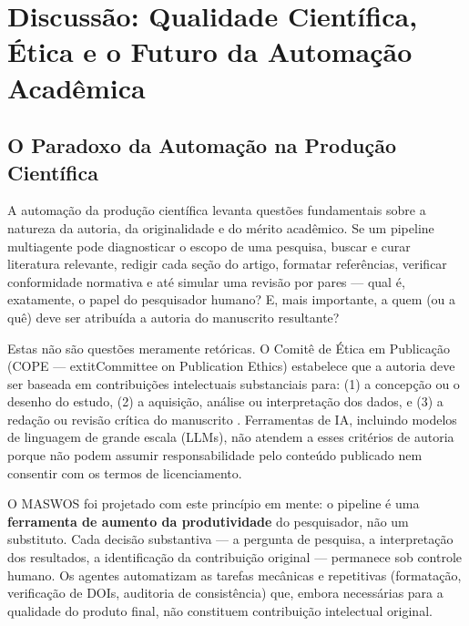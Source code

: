 

\section{Discussão: Qualidade Científica, Ética e o Futuro da Automação Acadêmica}
\label{sec:discussao_final}

\subsection{O Paradoxo da Automação na Produção Científica}
\label{sec:paradoxo}

A automação da produção científica levanta questões fundamentais
sobre a natureza da autoria, da originalidade e do mérito
acadêmico. Se um pipeline multiagente pode diagnosticar o escopo de
uma pesquisa, buscar e curar literatura relevante, redigir cada
seção do artigo, formatar referências, verificar conformidade
normativa e até simular uma revisão por pares — qual é,
exatamente, o papel do pesquisador humano? E, mais importante, a
quem (ou a quê) deve ser atribuída a autoria do manuscrito
resultante?

Estas não são questões meramente retóricas. O Comitê de Ética em
Publicação (COPE — 	extit{Committee on Publication Ethics})
estabelece que a autoria deve ser baseada em contribuições
intelectuais substanciais para: (1) a concepção ou o desenho do
estudo, (2) a aquisição, análise ou interpretação dos dados, e
(3) a redação ou revisão crítica do manuscrito
\cite{COPE_Authorship}. Ferramentas de IA, incluindo modelos de
linguagem de grande escala (LLMs), não atendem a esses critérios
de autoria porque não podem assumir responsabilidade pelo
conteúdo publicado nem consentir com os termos de licenciamento.

O MASWOS foi projetado com este princípio em mente: o pipeline é
uma \textbf{ferramenta de aumento da produtividade} do
pesquisador, não um substituto. Cada decisão substantiva — a
pergunta de pesquisa, a interpretação dos resultados, a
identificação da contribuição original — permanece sob controle
humano. Os agentes automatizam as tarefas mecânicas e repetitivas
(formatação, verificação de DOIs, auditoria de consistência) que,
embora necessárias para a qualidade do produto final, não
constituem contribuição intelectual original.

